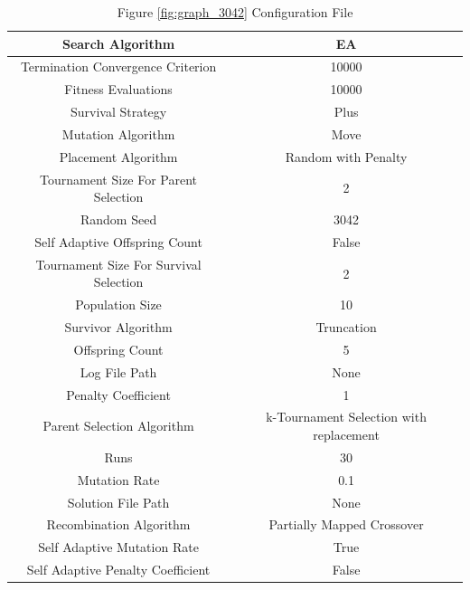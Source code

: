 \documentclass{standalone}
\begin{document}
\begin{table}[!htb]
	\centering
	\caption{Figure \ref{fig:graph_3042} Configuration File}
	\label{tab:graph_3042}
	\begin{tabular}{| c | c |}
		\hline
		Search Algorithm		& EA		 \\
		\hline
		Termination Convergence Criterion		& 10000		 \\
		\hline
		Fitness Evaluations		& 10000		 \\
		\hline
		Survival Strategy		& Plus		 \\
		\hline
		Mutation Algorithm		& Move		 \\
		\hline
		Placement Algorithm		& Random with Penalty		 \\
		\hline
		Tournament Size For Parent Selection		& 2		 \\
		\hline
		Random Seed		& 3042		 \\
		\hline
		Self Adaptive Offspring Count		& False		 \\
		\hline
		Tournament Size For Survival Selection		& 2		 \\
		\hline
		Population Size		& 10		 \\
		\hline
		Survivor Algorithm		& Truncation		 \\
		\hline
		Offspring Count		& 5		 \\
		\hline
		Log File Path		& None		 \\
		\hline
		Penalty Coefficient		& 1		 \\
		\hline
		Parent Selection Algorithm		& k-Tournament Selection with replacement		 \\
		\hline
		Runs		& 30		 \\
		\hline
		Mutation Rate		& 0.1		 \\
		\hline
		Solution File Path		& None		 \\
		\hline
		Recombination Algorithm		& Partially Mapped Crossover		 \\
		\hline
		Self Adaptive Mutation Rate		& True		 \\
		\hline
		Self Adaptive Penalty Coefficient		& False		 \\
		\hline
	\end{tabular}
\end{table}
\end{document}
